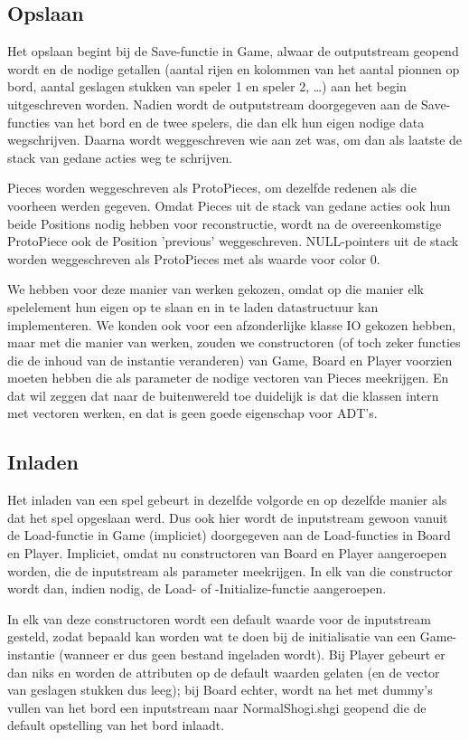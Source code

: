 \documentclass[a4paper,11pt,oneside, titlepage]{article}
\begin{document}
\subsection{Opslaan}
Het opslaan begint bij de Save-functie in Game, alwaar de outputstream geopend wordt en de nodige getallen (aantal rijen en kolommen van het aantal pionnen op bord, aantal geslagen stukken van speler 1 en speler 2, \ldots) aan het begin uitgeschreven worden. Nadien wordt de outputstream doorgegeven aan de Save-functies van het bord en de twee spelers, die dan elk hun eigen nodige data wegschrijven. Daarna wordt weggeschreven wie aan zet was, om dan als laatste de stack van gedane acties weg te schrijven.

Pieces worden weggeschreven als ProtoPieces, om dezelfde redenen als die voorheen werden gegeven. Omdat Pieces uit de stack van gedane acties ook hun beide Positions nodig hebben voor reconstructie, wordt na de overeenkomstige ProtoPiece ook de Position 'previous' weggeschreven. NULL-pointers uit de stack worden weggeschreven als ProtoPieces met als waarde voor color 0.

We hebben voor deze manier van werken gekozen, omdat op die manier elk spelelement hun eigen op te slaan en in te laden datastructuur kan implementeren. We konden ook voor een afzonderlijke klasse IO gekozen hebben, maar met die manier van werken, zouden we constructoren (of toch zeker functies die de inhoud van de instantie veranderen) van Game, Board en Player voorzien moeten hebben die als parameter de nodige vectoren van Pieces meekrijgen. En dat wil zeggen dat naar de buitenwereld toe duidelijk is dat die klassen intern met vectoren werken, en dat is geen goede eigenschap voor ADT's.
\subsection{Inladen}
Het inladen van een spel gebeurt in dezelfde volgorde en op dezelfde manier als dat het spel opgeslaan werd. Dus ook hier wordt de inputstream gewoon vanuit de Load-functie in Game (impliciet) doorgegeven aan de Load-functies in Board en Player. Impliciet, omdat nu constructoren van Board en Player aangeroepen worden, die de inputstream als parameter meekrijgen. In elk van die constructor wordt dan, indien nodig, de Load- of -Initialize-functie aangeroepen.

In elk van deze constructoren wordt een default waarde voor de inputstream gesteld, zodat bepaald kan worden wat te doen bij de initialisatie van een Game-instantie (wanneer er dus geen bestand ingeladen wordt). Bij Player gebeurt er dan niks en worden de attributen op de default waarden gelaten (en de vector van geslagen stukken dus leeg); bij Board echter, wordt na het met dummy's vullen van het bord een inputstream naar NormalShogi.shgi geopend die de default opstelling van het bord inlaadt.
\newpage
\end{document}
